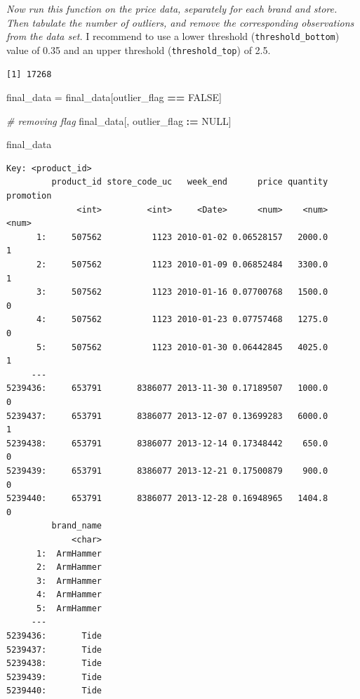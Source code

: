 \documentclass[
]{article}
\newenvironment{Shaded}{\begin{snugshade}}{\end{snugshade}}
\newcommand{\CommentTok}[1]{\textcolor[rgb]{0.56,0.35,0.01}{\textit{#1}}}
\newcommand{\ConstantTok}[1]{\textcolor[rgb]{0.56,0.35,0.01}{#1}}
\newcommand{\FloatTok}[1]{\textcolor[rgb]{0.00,0.00,0.81}{#1}}
\newcommand{\FunctionTok}[1]{\textcolor[rgb]{0.13,0.29,0.53}{\textbf{#1}}}
\newcommand{\NormalTok}[1]{#1}
\newcommand{\OtherTok}[1]{\textcolor[rgb]{0.56,0.35,0.01}{#1}}
\newcommand{\SpecialCharTok}[1]{\textcolor[rgb]{0.81,0.36,0.00}{\textbf{#1}}}
\begin{document}
\emph{Now run this function on the price data, separately for each brand
and store. Then tabulate the number of outliers, and remove the
corresponding observations from the data set.} I recommend to use a
lower threshold (\texttt{threshold\_bottom}) value of 0.35 and an upper
threshold (\texttt{threshold\_top}) of 2.5.

\begin{Shaded}
\end{Shaded}

\begin{verbatim}
[1] 17268
\end{verbatim}

\begin{Shaded}
\begin{Highlighting}[]
\NormalTok{final\_data }\OtherTok{=}\NormalTok{ final\_data[outlier\_flag }\SpecialCharTok{==} \ConstantTok{FALSE}\NormalTok{]}

\CommentTok{\# removing flag}
\NormalTok{final\_data[, outlier\_flag }\SpecialCharTok{:=} \ConstantTok{NULL}\NormalTok{]}

\NormalTok{final\_data}
\end{Highlighting}
\end{Shaded}

\begin{verbatim}
Key: <product_id>
         product_id store_code_uc   week_end      price quantity promotion
              <int>         <int>     <Date>      <num>    <num>     <num>
      1:     507562          1123 2010-01-02 0.06528157   2000.0         1
      2:     507562          1123 2010-01-09 0.06852484   3300.0         1
      3:     507562          1123 2010-01-16 0.07700768   1500.0         0
      4:     507562          1123 2010-01-23 0.07757468   1275.0         0
      5:     507562          1123 2010-01-30 0.06442845   4025.0         1
     ---                                                                  
5239436:     653791       8386077 2013-11-30 0.17189507   1000.0         0
5239437:     653791       8386077 2013-12-07 0.13699283   6000.0         1
5239438:     653791       8386077 2013-12-14 0.17348442    650.0         0
5239439:     653791       8386077 2013-12-21 0.17500879    900.0         0
5239440:     653791       8386077 2013-12-28 0.16948965   1404.8         0
         brand_name
             <char>
      1:  ArmHammer
      2:  ArmHammer
      3:  ArmHammer
      4:  ArmHammer
      5:  ArmHammer
     ---           
5239436:       Tide
5239437:       Tide
5239438:       Tide
5239439:       Tide
5239440:       Tide
\end{verbatim}
\end{document}
